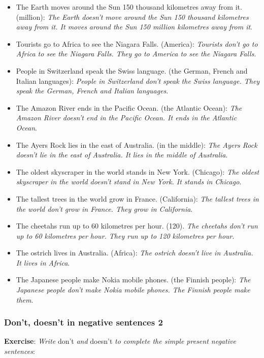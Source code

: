 \begin{itemize}

\item The Earth moves around the Sun 150 thousand kilometres away from it. (million):
\textit{The Earth doesn't move around the Sun 150 thousand kilometres away from it. It moves around the Sun 150 million kilometres away from it}.
\item Tourists go to Africa to see the Niagara Falls. (America): \textit{Tourists don't go to Africa to see the Niagara Falls. They go to America to see the Niagara Falls}.
\item People in Switzerland speak the Swiss language. (the German, French and Italian languages): \textit{People in Switzerland don't speak the Swiss language. They speak the German, French and Italian languages}.
\item The Amazon River ends in the Pacific Ocean. (the Atlantic Ocean): \textit{The Amazon River doesn't end in the Pacific Ocean. It ends in the Atlantic Ocean}.
\item The Ayers Rock lies in the east of Australia. (in the middle): \textit{The Ayers Rock doesn't lie in the east of Australia. It lies in the middle of Australia}.
\item The oldest skyscraper in the world stands in New York. (Chicago): \textit{The oldest skyscraper in the world doesn't stand in New York. It stands in Chicago}.
\item The tallest trees in the world grow in France. (California): \textit{The tallest trees in the world don't grow in France. They grow in California}.
\item The cheetahs run up to 60 kilometres per hour. (120). \textit{The cheetahs don't run up to 60 kilometres per hour. They run up to 120 kilometres per hour}.
\item The ostrich lives in Australia. (Africa): \textit{The ostrich doesn't live in Australia. It lives in Africa}.
\item The Japanese people make Nokia mobile phones. (the Finnish people): \textit{The Japanese people don't make Nokia mobile phones. The Finnish people make them}.
\end{itemize}

\subsubsection{Don't, doesn't in negative sentences 2}

\textbf{Exercise}: \textit{Write} don't \textit{and} doesn't \textit{to complete the simple present negative sentences}:

